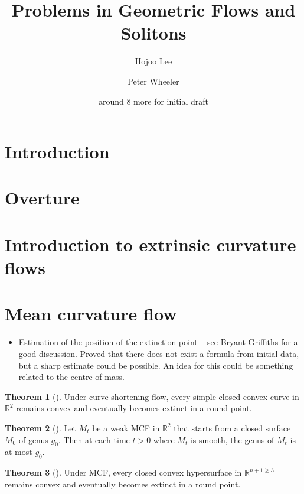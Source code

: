 \documentclass{amsart}
\title[Problems in Geometric Flows and Solitons]{Problems in Geometric Flows and Solitons}
\author[]{Hojoo Lee}
\author[]{Peter Wheeler}
\author[]{around 8 more for initial draft}
\theoremstyle{definition}
\newtheorem{Thm}{Theorem}[section]
\begin{document}
\maketitle
\tableofcontents

\section{Introduction}
\label{sec:intro}
 
\section{Overture} 

\section{Introduction to extrinsic curvature flows}
  
\newpage 

\section{Mean curvature flow}

\begin{itemize}
\item Estimation of the position of the extinction point -- see Bryant-Griffiths for a good discussion. Proved that there does not exist a formula from initial data, but a sharp estimate could be possible. An idea for this could be something related to the centre of mass.
\end{itemize}

\begin{Thm}[\cite{Gage Hamilton 1986}]
Under curve shortening flow, every simple closed convex curve in ${\mathbb{R}}^{2}$ remains convex and eventually becomes extinct in a round point.
\end{Thm}

\begin{Thm}[\cite{White 1995}]
Let ${M}_{t}$ be a weak MCF in ${\mathbb{R}}^{2}$ that starts from a closed surface ${M}_{0}$ of genus $g_0$. Then at each time $t > 0$ where ${M}_{t}$ is smooth, the genus of  ${M}_{t}$ is at most $g_0$.
\end{Thm}

\begin{Thm}[\cite{Huisken 1984}]
Under MCF, every closed convex hypersurface in ${\mathbb{R}}^{n+1 \geq 3}$ remains convex and eventually becomes extinct in a round point.
\end{Thm}
 
\end{document}
